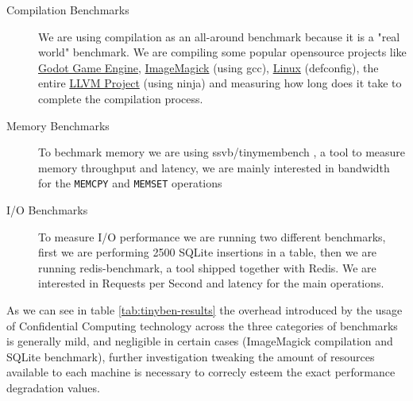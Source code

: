 \documentclass[twocolumn]{article}
\begin{document}
\begin{description}
    \item[Compilation Benchmarks] We are using compilation as an all-around benchmark because it is a "real world" benchmark. We are compiling some popular opensource projects like \href{https://github.com/godotengine/godot}{Godot Game Engine}, \href{https://github.com/imagemagick/imagemagick}{ImageMagick} (using gcc), \href{https://git.kernel.org/pub/scm/linux/kernel/git/torvalds/linux.git}{Linux} (defconfig), the entire \href{https://github.com/llvm/llvm-project}{LLVM Project} (using ninja) and measuring how long does it take to complete the compilation process.
    \item[Memory Benchmarks] To bechmark memory we are using ssvb/tinymembench \cite{tinymembench}, a tool to measure memory throughput and latency, we are mainly interested in bandwidth for the \texttt{MEMCPY} and \texttt{MEMSET} operations
    \item[I/O Benchmarks] To measure I/O performance we are running two different benchmarks, first we are performing 2500 SQLite insertions in a table, then we are running redis-benchmark, a tool shipped together with Redis. We are interested in Requests per Second and latency for the main operations. 
\end{description}

As we can see in table \ref{tab:tinyben-results} the overhead introduced by the usage of Confidential Computing technology across the three categories of benchmarks is generally mild, and negligible in certain cases (ImageMagick compilation and SQLite benchmark), further investigation tweaking the amount of resources available to each machine is necessary to correcly esteem the exact performance degradation values.
\end{document}
